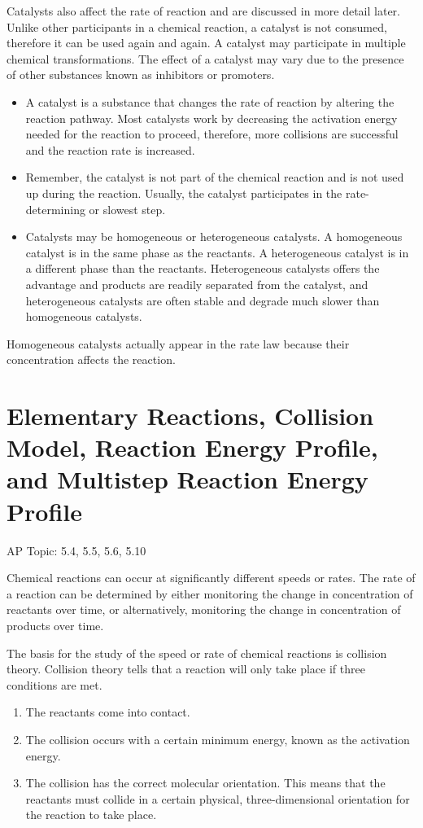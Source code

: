 \documentclass[../chem.tex]{subfiles}
\begin{document}
Catalysts also affect the rate of reaction and are discussed in more detail later. Unlike other participants in a chemical reaction, a catalyst is not 
consumed, therefore it can be used again and again. A catalyst may participate in multiple chemical transformations. The effect of a catalyst may 
vary due to the presence of other substances known as inhibitors or promoters.
\begin{itemize}
    \item A catalyst is a substance that changes the rate of reaction by altering the reaction pathway. Most catalysts work by decreasing the 
    activation energy needed for the reaction to proceed, therefore, more collisions are successful and the reaction rate is increased.
    \item Remember, the catalyst is not part of the chemical reaction and is not used up during the reaction. Usually, the catalyst participates in the rate-determining or slowest step.
    \item Catalysts may be homogeneous or heterogeneous catalysts. A homogeneous catalyst is in the same phase as the reactants. 
    A heterogeneous catalyst is in a different phase than the reactants. Heterogeneous catalysts offers the advantage and products are readily separated from 
    the catalyst, and heterogeneous catalysts are often stable and degrade much slower than homogeneous catalysts.
\end{itemize}

Homogeneous catalysts actually appear in the rate law because their concentration affects the reaction.

\section{Elementary Reactions, Collision Model, Reaction Energy Profile, and Multistep Reaction Energy Profile}
AP Topic: 5.4, 5.5, 5.6, 5.10

Chemical reactions can occur at significantly different speeds or rates. The rate of a reaction can be determined by either monitoring the 
change in concentration of reactants over time, or alternatively, monitoring the change in concentration of products over time.

The basis for the study of the speed or rate of chemical reactions is collision theory. Collision theory tells that a reaction will only take place if three conditions are met.
\begin{enumerate}
    \item The reactants come into contact.
    \item The collision occurs with a certain minimum energy, known as the activation energy.
    \item The collision has the correct molecular orientation. This means that the reactants must collide in a certain physical, three-dimensional orientation for the reaction to take place.
\end{enumerate}
\end{document}
